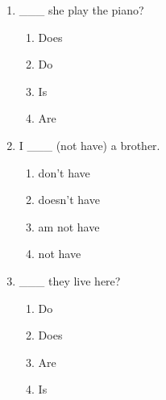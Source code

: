\documentclass[11pt,a4paper]{ctexart}
\begin{document}
\begin{enumerate}[leftmargin=*,itemsep=4pt]
\begin{enumerate}[label=\Alph*.,leftmargin=2em,itemsep=1pt,topsep=2pt]
\end{enumerate}
\item \_\_\_ she play the piano?
\begin{enumerate}[label=\Alph*.,leftmargin=2em,itemsep=1pt,topsep=2pt]
\item Does
\item Do
\item Is
\item Are
\end{enumerate}
\item I \_\_\_ (not have) a brother.
\begin{enumerate}[label=\Alph*.,leftmargin=2em,itemsep=1pt,topsep=2pt]
\item don’t have
\item doesn’t have
\item am not have
\item not have
\end{enumerate}
\item \_\_\_ they live here?
\begin{enumerate}[label=\Alph*.,leftmargin=2em,itemsep=1pt,topsep=2pt]
\item Do
\item Does
\item Are
\item Is
\end{enumerate}
\end{enumerate}
\end{document}

